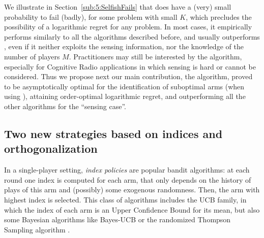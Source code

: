 We illustrate in Section~\ref{sub:5:SelfishFails} that \Selfish{} does have a (very) small probability to fail (badly), for some problem with small $K$,
which precludes the possibility of a logarithmic regret for any problem.
In most cases, it empirically performs similarly to all the algorithms described before,
and usually outperforms \rhoRand,
even if it neither exploits the sensing information, nor the knowledge of the number of players $M$.
%
Practitioners may still be interested by the algorithm, especially for Cognitive Radio applications in which sensing is hard or cannot be considered.
Thus we propose next our main contribution, the \MCTopM{} algorithm, proved to be asymptotically optimal for the identification of suboptimal arms (when using \klUCB), attaining order-optimal logarithmic regret, and outperforming all the other algorithms for the ``sensing case''.



\subsection{Two new strategies based on indices and orthogonalization}
\label{sub:5:RandTopM_and_MCTopM}


In a single-player setting, \emph{index policies} are popular bandit algorithms: at each round one index is computed for each arm, that only depends on the history of plays of this arm and (possibly) some exogenous randomness. Then, the arm with highest index is selected. This class of algorithms includes the UCB family, in which the index of each arm is an Upper Confidence Bound for its mean, but also some Bayesian algorithms like Bayes-UCB \citep{Kaufmann12BUCB} or the randomized Thompson Sampling algorithm \citep{Thompson33,AgrawalGoyal11,Kaufmann12Thompson}.


